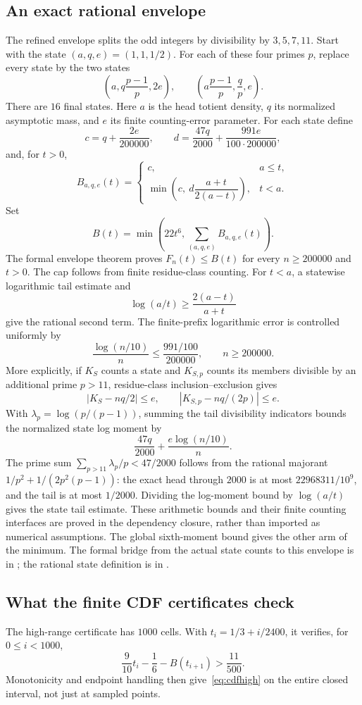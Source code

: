 \subsection{An exact rational envelope}
The refined envelope splits the odd integers by divisibility by $3,5,7,11$. Start with the state $(a,q,e)=(1,1,1/2)$. For each of these four primes $p$, replace every state by the two states
\[
 \left(a,q\frac{p-1}{p},2e\right),\qquad
 \left(a\frac{p-1}{p},\frac qp,e\right).
\]
There are $16$ final states. Here $a$ is the head totient density, $q$ its normalized asymptotic mass, and $e$ its finite counting-error parameter. For each state define
\[
 c=q+\frac{2e}{200000},\qquad
 d=\frac{47q}{2000}+\frac{991e}{100\cdot200000},
\]
and, for $t>0$,
\[
 B_{a,q,e}(t)=
 \begin{cases}
 c,&a\le t,\\
 \min\left(c,\ d\dfrac{a+t}{2(a-t)}\right),&t<a.
 \end{cases}
\]
Set
\[
 B(t)=\min\left(22t^6,\sum_{(a,q,e)}B_{a,q,e}(t)\right).
\]
The formal envelope theorem proves $F_n(t)\le B(t)$ for every $n\ge200000$ and $t>0$. The cap follows from finite residue-class counting. For $t<a$, a statewise logarithmic tail estimate and
\[
 \log(a/t)\ge\frac{2(a-t)}{a+t}
\]
give the rational second term. The finite-prefix logarithmic error is controlled uniformly by
\[
 \frac{\log(n/10)}n\le\frac{991/100}{200000},
 \qquad n\ge200000.
\]
More explicitly, if $K_S$ counts a state and $K_{S,p}$ counts its members divisible by an additional prime $p>11$, residue-class inclusion--exclusion gives
\[
 |K_S-nq/2|\le e,\qquad |K_{S,p}-nq/(2p)|\le e.
\]
With $\lambda_p=\log(p/(p-1))$, summing the tail divisibility indicators bounds the normalized state log moment by
\[
 \frac{47q}{2000}+\frac{e\log(n/10)}{n}.
\]
The prime sum $\sum_{p>11}\lambda_p/p<47/2000$ follows from the rational majorant $1/p^2+1/(2p^2(p-1))$: the exact head through $2000$ is at most $22968311/10^9$, and the tail is at most $1/2000$. Dividing the log-moment bound by $\log(a/t)$ gives the state tail estimate. These arithmetic bounds and their finite counting interfaces are proved in the dependency closure, rather than imported as numerical assumptions. The global sixth-moment bound gives the other arm of the minimum. The formal bridge from the actual state counts to this envelope is in ; the rational state definition is in .

\subsection{What the finite CDF certificates check}
The high-range certificate has $1000$ cells. With $t_i=1/3+i/2400$, it verifies, for $0\le i<1000$,
\[
 \frac9{10}t_i-\frac16-B(t_{i+1})>\frac{11}{500}.
\]
Monotonicity and endpoint handling then give~\eqref{eq:cdfhigh} on the entire closed interval, not just at sampled points.

